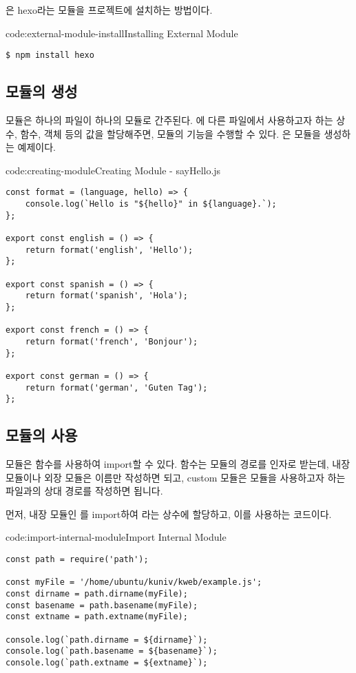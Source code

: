은 hexo라는 모듈을 프로젝트에 설치하는 방법이다.

\begin{codeenv}{code:external-module-install}{Installing External Module}\begin{verbatim}
$ npm install hexo
\end{verbatim}
\end{codeenv}

\subsection*{모듈의 생성}

모듈은 하나의 파일이 하나의 모듈로 간주된다. 에 다른 파일에서 사용하고자 하는 상수, 함수, 객체 등의 값을 할당해주면, 모듈의 기능을 수행할 수 있다. 은 모듈을 생성하는 예제이다.

\begin{codeenv}{code:creating-module}{Creating Module - sayHello.js}\begin{verbatim}
const format = (language, hello) => {
    console.log(`Hello is "${hello}" in ${language}.`);
};

export const english = () => {
    return format('english', 'Hello');
};

export const spanish = () => {
    return format('spanish', 'Hola');
};

export const french = () => {
    return format('french', 'Bonjour');
};

export const german = () => {
    return format('german', 'Guten Tag');
};
\end{verbatim}
\end{codeenv}

\subsection*{모듈의 사용}

모듈은  함수를 사용하여 import할 수 있다.  함수는 모듈의 경로를 인자로 받는데, 내장 모듈이나 외장 모듈은 이름만 작성하면 되고, custom 모듈은 모듈을 사용하고자 하는 파일과의 상대 경로를 작성하면 됩니다.

먼저, \은 내장 모듈인 를 import하여 라는 상수에 할당하고, 이를 사용하는 코드이다.

\begin{codeenv}{code:import-internal-module}{Import Internal Module}\begin{verbatim}
const path = require('path');

const myFile = '/home/ubuntu/kuniv/kweb/example.js';
const dirname = path.dirname(myFile);
const basename = path.basename(myFile);
const extname = path.extname(myFile);

console.log(`path.dirname = ${dirname}`);
console.log(`path.basename = ${basename}`);
console.log(`path.extname = ${extname}`);
\end{verbatim}
\end{codeenv}


